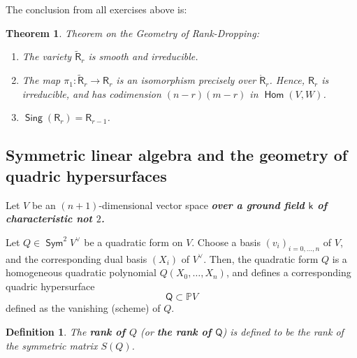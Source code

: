 \documentclass[11pt]{article}
\renewcommand{\P}{\mathbb{P}}
\renewcommand{\k}{\mathsf{k}}
\renewcommand{\to}{\longrightarrow}
\DeclareMathOperator{\Hom}{\mathsf{Hom}}
\DeclareMathOperator{\sing}{\mathsf{Sing}}
\DeclareMathOperator{\Sym}{\mathsf{Sym}}
\renewcommand{\k}{\mathsf{k}}
\renewcommand{\P}{\mathbb P}
\renewcommand{\to}{{\longrightarrow}}
\newtheorem{theorem}{Theorem}[section]
\newtheorem{definition}{Definition}[section]
\begin{document}
The conclusion from all exercises above is: 

\begin{theorem}
Theorem on the Geometry of Rank-Dropping: 
\begin{enumerate}
\item The variety \(\widetilde{\mathsf{R}}_{r}\) is smooth and irreducible.
\item The map \(\pi_{1}: \widetilde{\mathsf{R}}_{r} \to \mathsf{R}_{r}\) is an isomorphism precisely over  \(\mathring{\mathsf{R}}_{r}\).  Hence, \(\mathsf{R}_{r}\) is irreducible, and has codimension \((n-r)(m-r)\) in \(\Hom(V,W)\).
\item \(\sing(\mathsf{R}_{r}) = \mathsf{R}_{r-1}\).
\end{enumerate}
\end{theorem}

\subsection{Symmetric linear algebra and the geometry of quadric hypersurfaces}
\label{sec:orgf1aebf7}

Let \(V\) be an \((n+1)\)-dimensional vector space \textbf{\emph{over a ground field \(\k\) of characteristic not \(2\).}}

Let \(Q \in \Sym^{2}V^{\vee}\) be a quadratic form on \(V\). Choose a basis \((v_{i})_{i=0, \ldots, n}\) of \(V\), and the corresponding dual basis \((X_{i})\) of \(V^{\vee}\).  Then, the quadratic form \(Q\) is a homogeneous quadratic polynomial \(Q(X_0, \ldots, X_n)\), and defines a corresponding quadric hypersurface $$\mathsf{Q} \subset \P V$$ defined as the vanishing (scheme) of \(Q\).


\begin{definition}
The \textbf{\emph{rank of \(Q\)}} (or \textbf{\emph{the rank of \(\mathsf{Q}\)}}) is defined to be the rank of the symmetric matrix \(S(Q)\).
\end{definition}
\end{document}
